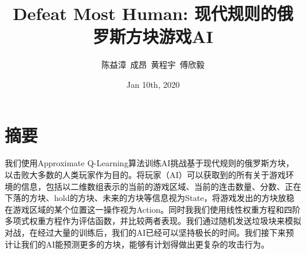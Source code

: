 \documentclass[10pt,UTF8]{article}
\title{Defeat Most Human: 现代规则的俄罗斯方块游戏AI}
\author{陈益漳\ 成昂\ 黄程宇\ 傅欣毅}
\date{Jan 10th, 2020}
\begin{document}
\maketitle
\section*{摘要}

我们使用Approximate Q-Learning算法训练AI挑战基于现代规则的俄罗斯方块，以击败大多数的人类玩家作为目的。将玩家（AI）可以获取到的所有关于游戏环境的信息，包括以二维数组表示的当前的游戏区域、当前的连击数量、分数、正在下落的方块、hold的方块、未来的方块等信息视为State，将游戏发出的方块放稳在游戏区域的某个位置这一操作视为Action。同时我我们使用线性权重方程和四阶多项式权重方程作为评估函数，并比较两者表现。我们通过随机发送垃圾块来模拟对战，在经过大量的训练后，我们的AI已经可以坚持极长的时间。我们接下来预计让我们的AI能预测更多的方块，能够有计划得做出更复杂的攻击行为。
\end{document}
